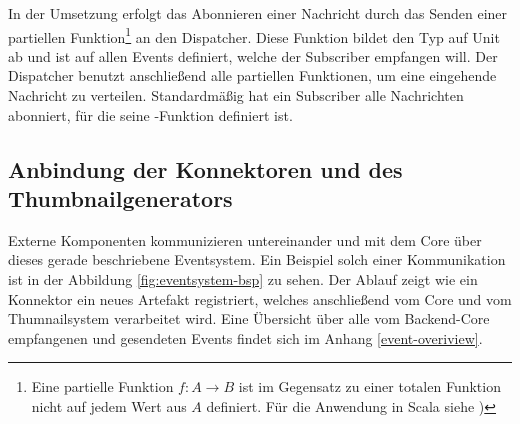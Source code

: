 In der Umsetzung erfolgt das Abonnieren einer Nachricht durch das Senden einer partiellen Funktion\footnote{Eine partielle Funktion $f: A \rightarrow B$ ist im Gegensatz zu einer totalen Funktion nicht auf jedem Wert aus $A$ definiert. Für die Anwendung in Scala siehe \cite{partial-function})} an den Dispatcher. Diese Funktion bildet den Typ  auf Unit ab und ist auf allen Events definiert, welche der Subscriber empfangen will. Der Dispatcher benutzt anschließend alle partiellen Funktionen, um eine eingehende Nachricht zu verteilen. Standardmäßig hat ein Subscriber alle Nachrichten abonniert, für die seine -Funktion definiert ist.

\subsection{Anbindung der Konnektoren und des Thumbnailgenerators}

Externe Komponenten kommunizieren untereinander und mit dem Core über dieses gerade beschriebene Eventsystem. Ein Beispiel solch einer Kommunikation ist in der Abbildung \ref{fig:eventsystem-bsp} zu sehen. Der Ablauf zeigt wie ein Konnektor ein neues Artefakt registriert, welches anschließend vom Core und vom Thumnailsystem verarbeitet wird. Eine Übersicht über alle vom Backend-Core empfangenen und gesendeten Events findet sich im Anhang \ref{event-overiview}.

